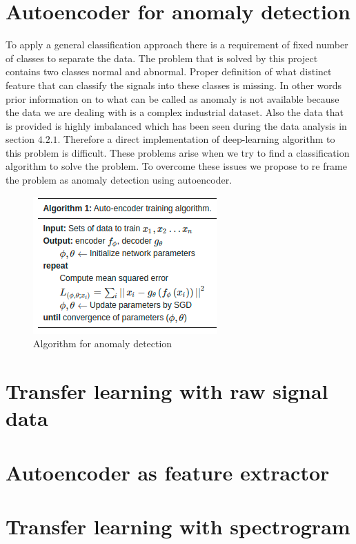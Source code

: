    \section{Autoencoder for anomaly detection}   
   To apply a general classification approach there is a requirement of fixed number of classes to separate the data. The problem that is solved by this project contains two classes normal and abnormal. Proper definition of what distinct feature that can classify the signals into these classes is missing. In other words prior information on to what can be called as anomaly is not available because the data we are dealing with is a complex industrial dataset.  Also the data that is provided is highly imbalanced which has been seen during the data analysis in section $4.2.1$. Therefore a direct implementation of deep-learning algorithm to this problem is difficult. These problems arise when we try to find a classification algorithm to solve the problem. To overcome these issues we propose to re frame the problem as anomaly detection using autoencoder.
   
    \begin{figure}[h]
    	\centering
    	\includegraphics[width=0.5\linewidth]{images/algau.png}
    	\caption{Algorithm for anomaly detection \cite{oh2018residual} }
    	\label{n0}
    \end{figure}
   
   \section{Transfer learning with raw signal data}
   
   
   \section{Autoencoder as feature extractor}    
   
   
   \section{Transfer learning with spectrogram}   

